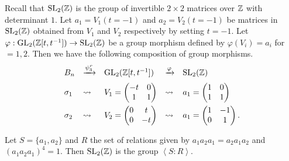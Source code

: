 Recall that $\text{SL}_2(\mathbb{Z}) $ is the group of invertible $2\times 2$ matrices over $\mathbb{Z}$ with determinant $1$. Let $a_1 = V_1(t = -1)$ and $a_2 = V_2(t = -1)$ be matrices in $\text{SL}_2(\mathbb{Z})$ obtained from $V_1$ and $V_2$ respectively by setting $t = -1$. Let $\varphi : \text{GL}_2(\mathbb{Z}[t, t^{-1}]) \to \text{SL}_2(\mathbb{Z})$ be a group morphism defined by $\varphi(V_i) = a_i$ for $=1,2$. Then we have the following composition of group morphisms.
\begin{equation}
\begin{array}{lllll}
  B_n & \xrightarrow{\psi_3^r} & \text{GL}_2(\mathbb{Z}[t,t^{-1}]) &  \xrightarrow{\varphi} & \text{SL}_2(\mathbb{Z}) \\[6pt]
  \sigma_1 & \rightsquigarrow & V_1 = \begin{pmatrix} -t & 0 \\ 1 & 1 \end{pmatrix} & \rightsquigarrow & a_1 = \begin{pmatrix} 1 & 0 \\ 1 & 1 \end{pmatrix} \\[10pt]
  \sigma_2 & \rightsquigarrow & V_2 = \begin{pmatrix} 0 & t \\ 0 & -t \end{pmatrix} & \rightsquigarrow & a_1 = \begin{pmatrix} 1 & -1 \\ 0 & 1 \end{pmatrix}.
\end{array}
\end{equation}

\begin{proposition}
\label{sec:burau-representation-10}
Let $S = \{a_1, a_2\}$ and $R$ the set of relations given by $ a_1a_2a_1 = a_2a_1a_2$ and $(a_1a_2a_1)^4 = 1$. Then $\text{SL}_2(\mathbb{Z})$ is the group $\left< S : R\right>$.
\end{proposition}

